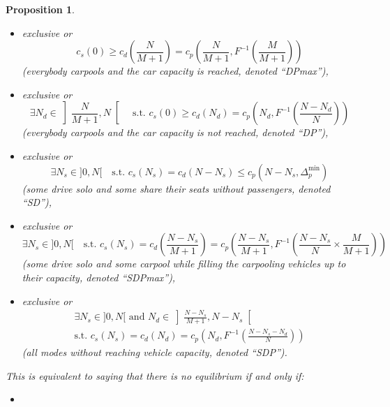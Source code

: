 \documentclass[english, a4paper]{article}
\theoremstyle{plain}
\newtheorem{proposition}{Proposition}
\theoremstyle{definition}
\theoremstyle{remark}
\begin{document}
\begin{proposition}
\begin{itemize}
\begin{itemize}
            \item exclusive or \begin{equation} \label{equation:phiint_condDPmax} c_s(0) \geq c_d\left(\frac{N}{M + 1} \right) = c_p\left(\frac{N}{M + 1}, F^{-1}\left(\frac{M}{M + 1}\right) \right) \end{equation} (everybody carpools and the car capacity is reached, denoted ``DPmax''),
            \item exclusive or \begin{equation} \label{equation:phiint_condDP} \exists N_d \in \left] \frac{N}{M + 1}, N \right[ \quad \text{s.t. }c_s(0) \geq c_d(N_d) = c_p \left( N_d, F^{-1} \left( \frac{N - N_d}{N} \right) \right) \end{equation} (everybody carpools and the car capacity is not reached, denoted ``DP''),
            \item exclusive or \begin{equation} \label{equation:phiint_condSD} \exists N_s \in ]0, N[ \quad \text{s.t. } c_s(N_s) = c_d(N - N_s) \leq c_p(N - N_s, \Delta_p^{\text{min}}) \end{equation} (some drive solo and some share their seats without passengers, denoted ``SD''),
            \item exclusive or \begin{equation} \label{equation:phiint_condSDPmax} \exists N_s \in ]0, N[ \quad \text{s.t. } c_s(N_s) = c_d\left(\frac{N - N_s}{M + 1}\right) = c_p\left(\frac{N - N_s}{M + 1}, F^{-1} \left( \frac{N - N_s}{N}\times \frac{M}{M + 1} \right)\right) \end{equation} (some drive solo and some carpool while filling the carpooling vehicles up to their capacity, denoted ``SDPmax''),
            \item exclusive or \begin{multline} \label{equation:phiint_condSDP} \exists N_s \in ]0, N[ \text{ and } N_d \in \left] \frac{N - N_s}{M + 1}, N - N_s\right[ \\ \text{s.t. } c_s(N_s) = c_d(N_d) = c_p\left(N_d, F^{-1}\left( \frac{N - N_s - N_d}{N} \right)\right) \end{multline} (all modes without reaching vehicle capacity, denoted ``SDP'').
        \end{itemize}
        This is equivalent to saying that there is no equilibrium if and only if:
        \begin{itemize}
            \item \begin{equation*}

\end{equation*}
\end{itemize}
\end{itemize}
\end{proposition}
\end{document}

